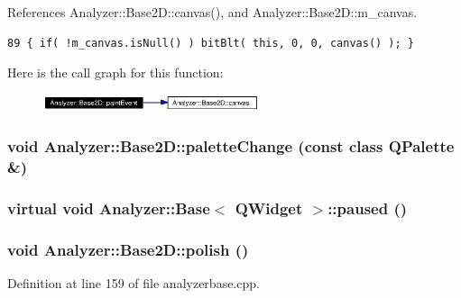 References Analyzer::Base2D::canvas(), and Analyzer::Base2D::m\_\-canvas.



\footnotesize\begin{verbatim}89 { if( !m_canvas.isNull() ) bitBlt( this, 0, 0, canvas() ); }
\end{verbatim}\normalsize 


Here is the call graph for this function:\begin{figure}[H]
\begin{center}
\leavevmode
\includegraphics[width=179pt]{classAnalyzer_1_1Base2D_Sonogramb2_cgraph}
\end{center}
\end{figure}
\subsubsection{\setlength{\rightskip}{0pt plus 5cm}void Analyzer::Base2D::palette\-Change (const class QPalette \&)\hspace{0.3cm}{\tt  [protected, inherited]}}\label{classAnalyzer_1_1Base2D_Sonogramb4}


\subsubsection{\setlength{\rightskip}{0pt plus 5cm}virtual void {\bf Analyzer::Base}$<$ {\bf QWidget}  $>$::paused ()\hspace{0.3cm}{\tt  [protected, virtual, inherited]}}\label{classAnalyzer_1_1Base_Analyzer_1_1Baseb4}


\subsubsection{\setlength{\rightskip}{0pt plus 5cm}void Analyzer::Base2D::polish ()\hspace{0.3cm}{\tt  [protected, inherited]}}\label{classAnalyzer_1_1Base2D_Sonogramb5}




Definition at line 159 of file analyzerbase.cpp.

